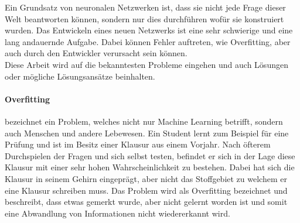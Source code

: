 Ein Grundsatz von neuronalen Netzwerken ist, dass sie nicht jede Frage dieser Welt beantworten können, sondern nur dies durchführen wofür sie konstruiert wurden. 
Das Entwickeln eines neuen Netzwerks ist eine sehr schwierige und eine lang andauernde Aufgabe. 
Dabei können Fehler auftreten, wie Overfitting, aber auch durch den Entwickler verursacht sein können. \\


\noindent
Diese Arbeit wird auf die bekanntesten Probleme eingehen und auch Lösungen oder mögliche Lösungsansätze beinhalten. 


\paragraph{Overfitting} bezeichnet ein Problem, welches nicht nur Machine Learning betrifft, sondern auch Menschen und andere Lebewesen. 
Ein Student lernt zum Beispiel für eine Prüfung und ist im Besitz einer Klausur aus einem Vorjahr. 
Nach öfterem Durchspielen der Fragen und sich selbst testen, befindet er sich in der Lage diese Klausur mit einer sehr hohen Wahrscheinlichkeit zu bestehen. 
Dabei hat sich die Klausur in seinem Gehirn eingeprägt, aber nicht das Stoffgebiet zu welchem er eine Klausur schreiben muss. 
Das Problem wird als Overfitting bezeichnet und beschreibt, dass etwas gemerkt wurde, aber nicht gelernt worden ist und somit eine Abwandlung von Informationen nicht wiedererkannt wird.


